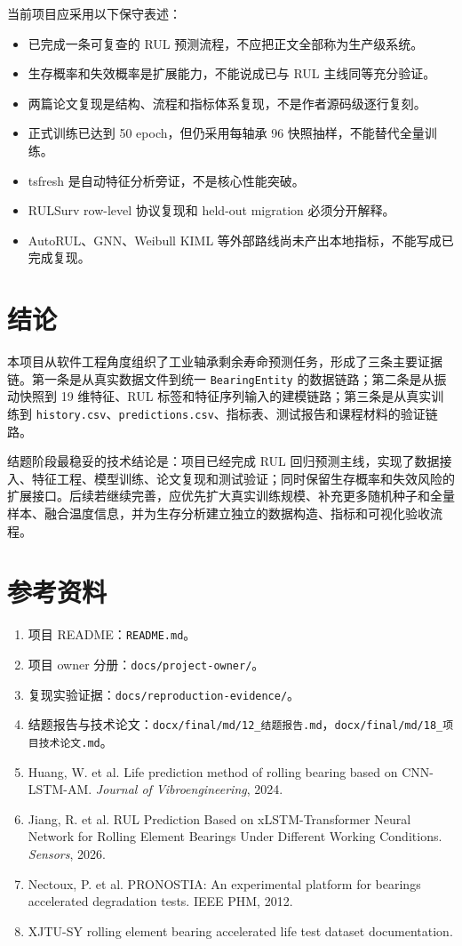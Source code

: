 \documentclass[UTF8,a4paper,12pt]{ctexart}
\newcommand{\code}[1]{\texttt{#1}}
\begin{document}
当前项目应采用以下保守表述：

\begin{itemize}
  \item 已完成一条可复查的 RUL 预测流程，不应把正文全部称为生产级系统。
  \item 生存概率和失效概率是扩展能力，不能说成已与 RUL 主线同等充分验证。
  \item 两篇论文复现是结构、流程和指标体系复现，不是作者源码级逐行复刻。
  \item 正式训练已达到 50 epoch，但仍采用每轴承 96 快照抽样，不能替代全量训练。
  \item tsfresh 是自动特征分析旁证，不是核心性能突破。
  \item RULSurv row-level 协议复现和 held-out migration 必须分开解释。
  \item AutoRUL、GNN、Weibull KIML 等外部路线尚未产出本地指标，不能写成已完成复现。
\end{itemize}

\section{结论}

本项目从软件工程角度组织了工业轴承剩余寿命预测任务，形成了三条主要证据链。第一条是从真实数据文件到统一 \code{BearingEntity} 的数据链路；第二条是从振动快照到 19 维特征、RUL 标签和特征序列输入的建模链路；第三条是从真实训练到 \code{history.csv}、\code{predictions.csv}、指标表、测试报告和课程材料的验证链路。

结题阶段最稳妥的技术结论是：项目已经完成 RUL 回归预测主线，实现了数据接入、特征工程、模型训练、论文复现和测试验证；同时保留生存概率和失效风险的扩展接口。后续若继续完善，应优先扩大真实训练规模、补充更多随机种子和全量样本、融合温度信息，并为生存分析建立独立的数据构造、指标和可视化验收流程。

\section*{参考资料}

\begin{enumerate}
  \item 项目 README：\code{README.md}。
  \item 项目 owner 分册：\code{docs/project-owner/}。
  \item 复现实验证据：\code{docs/reproduction-evidence/}。
  \item 结题报告与技术论文：\code{docx/final/md/12\_结题报告.md}，\code{docx/final/md/18\_项目技术论文.md}。
  \item Huang, W. et al. Life prediction method of rolling bearing based on CNN-LSTM-AM. \textit{Journal of Vibroengineering}, 2024.
  \item Jiang, R. et al. RUL Prediction Based on xLSTM-Transformer Neural Network for Rolling Element Bearings Under Different Working Conditions. \textit{Sensors}, 2026.
  \item Nectoux, P. et al. PRONOSTIA: An experimental platform for bearings accelerated degradation tests. IEEE PHM, 2012.
  \item XJTU-SY rolling element bearing accelerated life test dataset documentation.
\end{enumerate}
\end{document}
